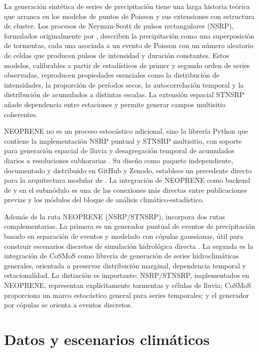 La generación sintética de series de precipitación tiene una larga historia teórica que arranca en los modelos de puntos de Poisson y sus extensiones con estructura de cluster. Los procesos de Neyman-Scott de pulsos rectangulares (NSRP), formulados originalmente por \textcite{rodriguezituribe1987,rodriguezituribe1988}, describen la precipitación como una superposición de tormentas, cada una asociada a un evento de Poisson con un número aleatorio de celdas que producen pulsos de intensidad y duración constantes. Estos modelos, calibrables a partir de estadísticos de primer y segundo orden de series observadas, reproducen propiedades esenciales como la distribución de intensidades, la proporción de períodos secos, la autocorrelación temporal y la distribución de acumulados a distintas escalas. La extensión espacial STNSRP añade dependencia entre estaciones y permite generar campos multisitio coherentes.

NEOPRENE no es un proceso estocástico adicional, sino la librería Python que contiene la implementación NSRP puntual y STNSRP multisitio, con soporte para generación espacial de lluvia y desagregación temporal de acumulados diarios a resoluciones subhorarias \parencite{diezsierra2023neoprene}. Su diseño como paquete independiente, documentado y distribuido en GitHub y Zenodo, establece un precedente directo para la arquitectura modular de \pyhydra. La integración de NEOPRENE como backend de  y  en el submódulo  es una de las conexiones más directas entre publicaciones previas y los módulos del bloque de análisis climático-estadístico.

Además de la ruta NEOPRENE (NSRP/STNSRP), \pyhydra incorpora dos rutas complementarias. La primera es un generador puntual de eventos de precipitación basado en separación de eventos y modelado con cópulas gaussianas, útil para construir escenarios discretos de simulación hidrológica directa \parencite{navas2018besaya,navas2024calle30}. La segunda es la integración de CoSMoS como librería de generación de series hidroclimáticas generales, orientada a preservar distribución marginal, dependencia temporal y estacionalidad. La distinción es importante: NSRP/STNSRP, implementados en NEOPRENE, representan explícitamente tormentas y células de lluvia; CoSMoS proporciona un marco estocástico general para series temporales; y el generador por cópulas se orienta a eventos discretos.

\section{Datos y escenarios climáticos}
\label{sec:datos_escenarios}

